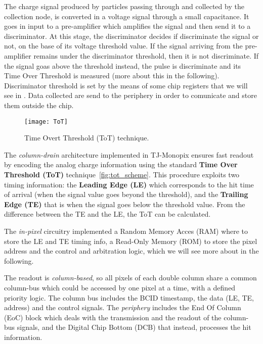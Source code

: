 The charge signal produced by particles passing through and collected by the collection node, is converted in a voltage signal through a small capacitance. It goes in input to a pre-amplifier which amplifies the signal and then send it to a discriminator. At this stage, the discriminator decides if discriminate the signal or not, on the base of its voltage threshold value. If the signal arriving from the pre-amplifier remains under the discriminator threshold, then it is not discriminate. If the signal goas above the threshold instead, the pulse is discriminate and its Time Over Threshold is measured (more about this in the following). Discriminator threshold is set by the means of some chip registers that we will see in \label{ch:TJ2}. Data collected are send to the periphery in order to comunicate and store them outside the chip.\\

\begin{figure}[h!]
\centering
\texttt{[image: ToT]}
\caption{Time Overt Threshold (ToT) technique.}
\label{fig:tot_scheme}
\end{figure}


The \textit{column-drain} architecture implemented in TJ-Monopix ensures fast readout by encoding the analog charge information using the standard \textbf{Time Over Threshold (ToT)} technique~\autoref{fig:tot_scheme}. This procedure exploits two timing information: the \textbf{Leading Edge (LE)} which corresponds to the hit time of arrival (when the signal value goes beyond the threshold), and the \textbf{Trailing Edge (TE)} that is when the signal goes below the threshold value. From the difference between the TE and the LE, the ToT can be calculated.  %

The \textit{in-pixel} circuitry implemented a Random Memory Acces (RAM) where to store the LE and TE timing info, a Read-Only Memory (ROM) to store the pixel address and the control and arbitration logic, which we will see more about in the following.
 
The readout is \textit{column-based}, so all pixels of each double column share a common column-bus which could be accessed by one pixel at a time, with a defined priority logic. The column bus includes the BCID timestamp, the data (LE, TE, address) and the control signals.
The \textit{periphery} includes the End Of Column (EoC) block which deals with the transmission and the readout of the column-bus signals, and the Digital Chip Bottom (DCB) that instead, processes the hit information. 

